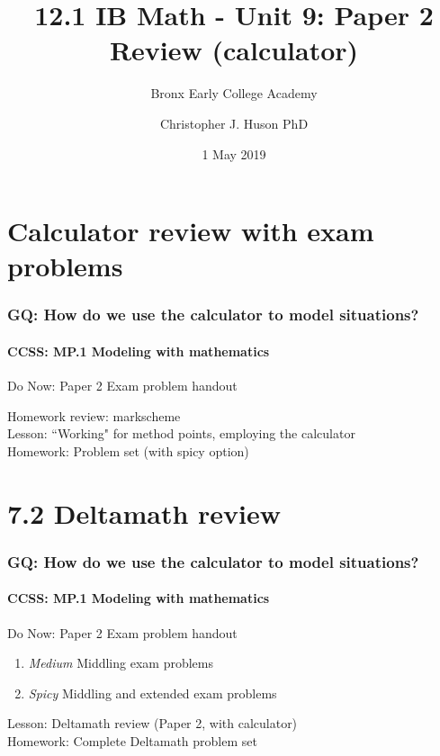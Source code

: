 \documentclass{beamer}
\title{12.1 IB Math - Unit 9: Paper 2 Review (calculator)}
\subtitle{Bronx Early College Academy}
\author{Christopher J. Huson PhD}
\date{1 May 2019}
\begin{document}
\frame{\titlepage}

\section[Outline]{}
\frame{\tableofcontents}

\section{Calculator review with exam problems}
  \frame
  {
    \frametitle{GQ: How do we use the calculator to model situations?}
    \framesubtitle{CCSS: MP.1 Modeling with mathematics}

    \begin{block}{Do Now: Paper 2 Exam problem handout}
    \end{block}
    Homework review: markscheme\\
    Lesson: ``Working" for method points, employing the calculator \\ \bigskip
    Homework: Problem set (with spicy option)
  }

\section{7.2 Deltamath review}
  \frame
  {
    \frametitle{GQ: How do we use the calculator to model situations?}
    \framesubtitle{CCSS: MP.1 Modeling with mathematics}

    \begin{block}{Do Now: Paper 2 Exam problem handout}
    \begin{enumerate}
        \item \emph{Medium} Middling exam problems
        \item \emph{Spicy} Middling and extended exam problems
    \end{enumerate}
    \end{block}

    Lesson: Deltamath review (Paper 2, with calculator)\\
    Homework: Complete Deltamath problem set
  }
\end{document}
